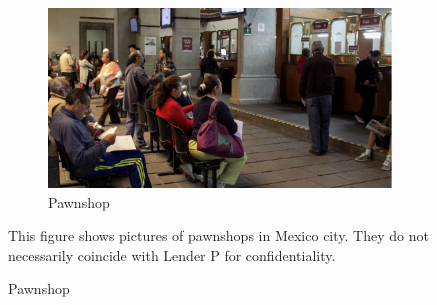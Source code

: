 \documentclass[11pt]{article}
\begin{document}
\begin{figure}[H]
\begin{center}
    \begin{subfigure}{0.5\textwidth}
    \caption{Pawnshop}
        \centering
        \includegraphics[width=\textwidth]{Figuras/empenio11.png}
    \end{subfigure}
    
    \end{center}
    \scriptsize
        This figure  shows pictures of pawnshops in Mexico city. They do not necessarily coincide with Lender P for confidentiality. 
\end{figure}
\end{document}
